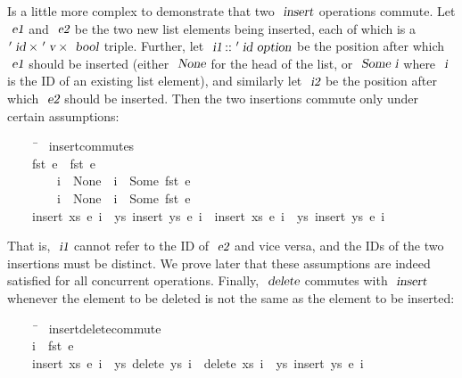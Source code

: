 Is a little more complex to demonstrate that two $\isa{insert}$ operations commute.
Let $\isa{e1}$ and $\isa{e2}$ be the two new list elements being inserted, each of which is a $\isacharprime\isa{id} \mathbin{\isasymtimes} \isacharprime\isa{v} \mathbin{\isasymtimes} \isa{bool}$ triple.
Further, let $\isa{i1} \mathbin{\isacharcolon\isacharcolon} \isacharprime\isa{id option}$ be the position after which $\isa{e1}$ should be inserted (either $\isa{None}$ for the head of the list, or $\isa{Some i}$ where $\isa{i}$ is the ID of an existing list element), and similarly let $\isa{i2}$ be the position after which $\isa{e2}$ should be inserted.
Then the two insertions commute only under certain assumptions:
\begin{isabelle}
~~~~\ \=\kill
{}\ insert{\isacharunderscore}commutes{\isacharcolon}\\
~~~~\>{\isachardoublequoteopen}fst\ e{}\ {\isasymnoteq}\ fst\ e{}{\isachardoublequoteclose}\\
~~~~~~~~\>{\isachardoublequoteopen}i{}\ {\isacharequal}\ None\ {\isasymor}\ i{}\ {\isasymnoteq}\ Some\ {\isacharparenleft}fst\ e{}{\isacharparenright}{\isachardoublequoteclose}\\
~~~~~~~~\>{\isachardoublequoteopen}i{}\ {\isacharequal}\ None\ {\isasymor}\ i{}\ {\isasymnoteq}\ Some\ {\isacharparenleft}fst\ e{}{\isacharparenright}{\isachardoublequoteclose}\\
~~~~\>{\isachardoublequoteopen}insert\ xs\ e{}\ i{}\ {\isasymbind}\ {\isacharparenleft}{\isasymlambda}ys{\isachardot}\ insert\ ys\ e{}\ i{}{\isacharparenright}\ {\isacharequal}\ insert\ xs\ e{}\ i{}\ {\isasymbind}\ {\isacharparenleft}{\isasymlambda}ys{\isachardot}\ insert\ ys\ e{}\ i{}{\isacharparenright}{\isachardoublequoteclose}
\end{isabelle}
\noindent
That is, $\isa{i1}$ cannot refer to the ID of $\isa{e2}$ and vice versa, and the IDs of the two insertions must be distinct.
We prove later that these assumptions are indeed satisfied for all concurrent operations.
Finally, $\isa{delete}$ commutes with $\isa{insert}$ whenever the element to be deleted is not the same as the element to be inserted:
\begin{isabelle}
~~~~\ \=\kill
{}\ insert{\isacharunderscore}delete{\isacharunderscore}commute{\isacharcolon}\\
~~~~\>{\isachardoublequoteopen}i{}\ {\isasymnoteq}\ fst\ e{\isachardoublequoteclose}\\
~~~~\>{\isachardoublequoteopen}insert\ xs\ e\ i{}\ {\isasymbind}\ {\isacharparenleft}{\isasymlambda}ys{\isachardot}\ delete\ ys\ i{}{\isacharparenright}\ {\isacharequal}\ delete\ xs\ i{}\ {\isasymbind}\ {\isacharparenleft}{\isasymlambda}ys{\isachardot}\ insert\ ys\ e\ i{}{\isacharparenright}{\isachardoublequoteclose}
\end{isabelle}

